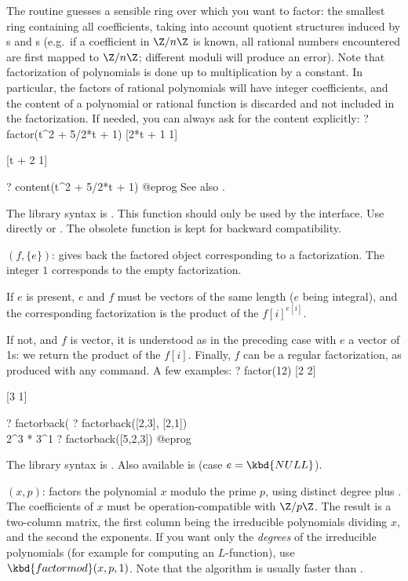 The routine guesses a sensible ring over which you want to factor: the
smallest ring containing all coefficients, taking into account quotient
structures induced by s and s (e.g.~if a coefficient
in $\Z/n\Z$ is known, all rational numbers encountered are first mapped to
$\Z/n\Z$; different moduli will produce an error).
Note that factorization of polynomials is done up to
multiplication by a constant. In particular, the factors of rational
polynomials will have integer coefficients, and the content of a polynomial
or rational function is discarded and not included in the factorization. If
needed, you can always ask for the content explicitly:
\bprog
? factor(t^2 + 5/2*t + 1)
[2*t + 1 1]

[t + 2 1]

? content(t^2 + 5/2*t + 1)
@eprog\noindent
See also .

The library syntax is .
This function should only be used by the  interface. Use
directly  or .
The obsolete function  is kept for
backward compatibility.

$(f,\{e\})$: \label{se:factorback}gives back the factored object
corresponding to a factorization. The integer $1$ corresponds to the empty
factorization.

If $e$ is present, $e$ and $f$ must be vectors of the same length ($e$ being
integral), and the corresponding factorization is the product of the
$f[i]^{e[i]}$.

If not, and $f$ is vector, it is understood as in the preceding case with $e$
a vector of 1s: we return the product of the $f[i]$. Finally, $f$ can be a
regular factorization, as produced with any  command. A few
examples:
\bprog
? factor(12)
[2 2]

[3 1]

? factorback(%
? factorback([2,3], [2,1])   \\ 2^3 * 3^1
? factorback([5,2,3])
@eprog

The library syntax is .
Also available is  (case $e = \kbd{NULL}$).

$(x,p)$: \label{se:factorcantor}factors the polynomial $x$ modulo the
prime $p$, using distinct degree plus
. The coefficients of $x$ must be
operation-compatible with $\Z/p\Z$. The result is a two-column matrix, the
first column being the irreducible polynomials dividing $x$, and the second
the exponents. If you want only the \emph{degrees} of the irreducible
polynomials (for example for computing an $L$-function), use
$\kbd{factormod}(x,p,1)$. Note that the  algorithm is
usually faster than .

